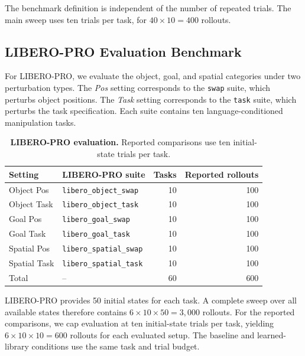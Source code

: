 The benchmark definition is independent of the number of repeated trials. The
main sweep uses ten trials per task, for $40 \times 10 = 400$ rollouts.

\subsection{LIBERO-PRO Evaluation Benchmark}
\label{sec:appendix_libero_pro_benchmark}

For LIBERO-PRO, we evaluate the object, goal, and spatial
categories under two perturbation types. The \emph{Pos} setting corresponds to
the \texttt{swap} suite, which perturbs object positions. The \emph{Task}
setting corresponds to the \texttt{task} suite, which perturbs the task
specification. Each suite contains ten language-conditioned manipulation
tasks.

\begin{table}[t]
\centering
\caption{
\textbf{LIBERO-PRO evaluation.}
Reported comparisons use ten initial-state trials per task.
}
\label{tab:libero_pro_eval_benchmark}
\begin{tabular}{llrr}
\toprule
\textbf{Setting} & \textbf{LIBERO-PRO suite} & \textbf{Tasks} & \textbf{Reported rollouts} \\
\midrule
Object Pos & \texttt{libero\_object\_swap} & 10 & 100 \\
Object Task & \texttt{libero\_object\_task} & 10 & 100 \\
Goal Pos & \texttt{libero\_goal\_swap} & 10 & 100 \\
Goal Task & \texttt{libero\_goal\_task} & 10 & 100 \\
Spatial Pos & \texttt{libero\_spatial\_swap} & 10 & 100 \\
Spatial Task & \texttt{libero\_spatial\_task} & 10 & 100 \\
\midrule
Total & -- & 60 & 600 \\
\bottomrule
\end{tabular}

\end{table}

LIBERO-PRO provides 50 initial states for each task. A complete sweep over all
available states therefore contains $6 \times 10 \times 50 = 3{,}000$
rollouts. For the reported comparisons, we cap evaluation at ten
initial-state trials per task, yielding $6 \times 10 \times 10 = 600$ rollouts
for each evaluated setup. The baseline and learned-library conditions use the
same task and trial budget.
